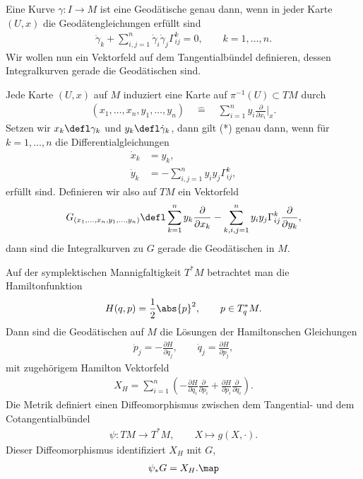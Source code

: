 \documentclass[%
	paper=a5,%
	fleqn,%
	DIV=18,%
	BCOR=0mm,
	fontsize=11pt,
	titlepage=false,%
	bibliography=totoc,
	DIV=18,%
	twoside=true,
	pdftitle=Riemannsche Geometrie,
	pdfauthor=Uwe Semmelmann,
	numbers=noendperiod]%
	{scrbook}
\begin{document}
Eine Kurve $\gamma: I\to M$ ist eine Geodätische genau dann, wenn in jeder Karte $(U,x)$ die Geodätengleichungen erfüllt sind
\begin{align*}
\ddot\gamma_{k} + \sum_{i,j=1}^n \dot\gamma_{i}\dot\gamma_{j} \Gamma_{ij}^k = 0,\qquad k=1,\ldots,n.\tag{*}
\end{align*}
Wir wollen nun ein Vektorfeld auf dem Tangentialbündel definieren, dessen Integralkurven gerade die Geodätischen sind.

Jede Karte $(U,x)$ auf $M$ induziert eine Karte auf $\pi^{-1}(U)\subset TM$ durch
\begin{align*}
(x_{1},\ldots,x_{n},y_{1},\ldots,y_{n})\quad \hat{=}\quad \sum_{i=1}^n y_{i}\frac{\partial}{\partial x_{i}}\bigg|_{x}.
\end{align*} 
Setzen wir $x_{k} \defl \gamma_{k}$ und $y_{k}\defl \dot\gamma_{k}$, dann gilt (*) genau dann, wenn für $k=1,\ldots,n$ die Differentialgleichungen
\begin{align*}
\dot x_{k} &= y_{k},\\
\dot y_{k} &= -\sum_{i,j=1}^n y_{i} y_{j} \Gamma_{ij}^k,
\end{align*}
erfüllt sind. Definieren wir also auf $TM$ ein Vektorfeld
\begin{align*}
G_{(x_{1},\ldots,x_{n},y_{1},\ldots,y_{n})} \defl \sum_{k=1}^n y_{k} \frac{\partial}{\partial x_{k}} - 
\sum_{k,i,j=1}^n  y_{i}y_{j}\Gamma_{ij}^k \frac{\partial}{\partial y_{k}},
\end{align*}
dann sind die Integralkurven zu $G$ gerade die Geodätischen in $M$.

\begin{rem}
Auf der symplektischen Mannigfaltigkeit $T^*M$ betrachtet man die Hamiltonfunktion
\begin{align*}
H(q,p) = \frac{1}{2}\abs{p}^2,\qquad p\in T_{q}^*M.
\end{align*}
Dann sind die Geodätischen auf $M$ die Lösungen der Hamiltonschen Gleichungen
\begin{align*}
\dot p_{j} = -\frac{\partial H}{\partial q_{j}},\qquad \dot q_{j} = \frac{\partial H}{\partial p_{j}},
\end{align*}
mit zugehörigem Hamilton Vektorfeld
\begin{align*}
X_{H} = \sum_{i=1}^n \left( -\frac{\partial H}{\partial q_{i}}\frac{\partial}{\partial p_{i}}
+ \frac{\partial H}{\partial p_{i}}\frac{\partial}{\partial q_{i}}\right).
\end{align*}
Die Metrik definiert einen Diffeomorphismus zwischen dem Tangential- und dem Cotangentialbündel
\begin{align*}
\psi : TM\to T^*M,\qquad X\mapsto g(X,\cdot).
\end{align*}
Dieser Diffeomorphismus identifiziert $X_{H}$ mit $G$,
\begin{align*}
\psi_{*}G = X_{H}.\map
\end{align*}
\end{rem}
\end{document}
